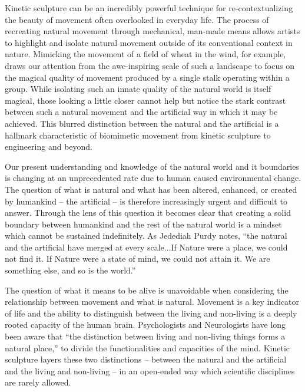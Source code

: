 \documentclass[letterpaper]{article}
\begin{document}


Kinetic sculpture can be an incredibly powerful technique for re-contextualizing the beauty of movement often overlooked in everyday life. The process of recreating natural movement through mechanical, man-made means allows artists to highlight and isolate natural movement outside of its conventional context in nature. Mimicking the movement of a field of wheat in the wind, for example, draws our attention from the awe-inspiring scale of such a landscape to focus on the magical quality of movement produced by a single stalk operating within a group. While isolating such an innate quality of the natural world is itself magical, those looking a little closer cannot help but notice the stark contrast between such a natural movement and the artificial way in which it may be achieved. This blurred distinction between the natural and the artificial is a hallmark characteristic of biomimetic movement from kinetic sculpture to engineering and beyond. 

Our present understanding and knowledge of the natural world and it boundaries is changing at an unprecedented rate due to human caused environmental change. The question of what is natural and what has been altered, enhanced, or created by humankind -- the artificial -- is therefore increasingly urgent and difficult to answer. Through the lens of this question it becomes clear that creating a solid boundary between humankind and the rest of the natural world is a mindset which cannot be sustained indefinitely.\cite{smith} As Jedediah Purdy notes, ``the natural and the artificial have merged at every scale...If Nature were a place, we could not find it. If Nature were a state of mind, we could not attain it. We are something else, and so is the world.''\cite{purdy}

The question of what it means to be alive is unavoidable when considering the relationship between movement and what is natural. Movement is a key indicator of life and the ability to distinguish between the living and non-living is a deeply rooted capacity of the human brain. Psychologists and Neurologists have long been aware that ``the distinction between living and non-living things forms a natural place,'' to divide the functionalities and capacities of the mind.\cite{narine} Kinetic sculpture layers these two distinctions -- between the natural and the artificial and the living and non-living -- in an open-ended way which scientific disciplines are rarely allowed.   
\end{document}
